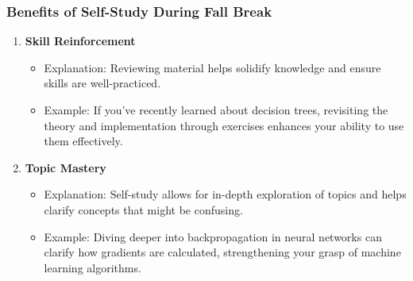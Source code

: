 \documentclass[aspectratio=169]{beamer}
\begin{document}
\begin{frame}[fragile]
  \frametitle{Benefits of Self-Study During Fall Break}
  \begin{enumerate}
    \item \textbf{Skill Reinforcement}
      \begin{itemize}
        \item Explanation: Reviewing material helps solidify knowledge and ensure skills are well-practiced.
        \item Example: If you've recently learned about decision trees, revisiting the theory and implementation through exercises enhances your ability to use them effectively.
      \end{itemize}
    
    \item \textbf{Topic Mastery}
      \begin{itemize}
        \item Explanation: Self-study allows for in-depth exploration of topics and helps clarify concepts that might be confusing.
        \item Example: Diving deeper into backpropagation in neural networks can clarify how gradients are calculated, strengthening your grasp of machine learning algorithms.
      \end{itemize}
  \end{enumerate}
\end{frame}
\end{document}
